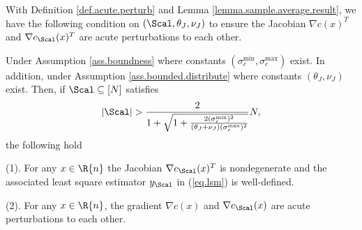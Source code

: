 
With Definition \ref{def.acute.perturb} and Lemma \ref{lemma.sample.average.result}, we have the following condition on $(\Scal,\theta_J,\nu_J)$ to ensure the Jacobian $\nabla c(x)^T$ and $\nabla c_{\Scal}(x)^T$ are acute perturbations to each other.

\begin{lemma}
\label{lemma.acute.perturb}
	Under Assumption \ref{ass.boundness} where constants $(\sigma_c^{\min},\sigma_c^{\max})$ exist. In addition, under Assumption \ref{ass.bounded.distribute} where constants $(\theta_J,\nu_J)$ exist. Then, if $\Scal\subseteq[N]$ satisfies 
	\[
	|\Scal|>\frac{2}{1+\sqrt{1+\frac{2(\sigma_c^{\min})^2}{(\theta_J+\nu_J)(\sigma_c^{\max})^2}}}N ,
	\]
	the following hold 
	\bitemize 
	\item[(1).]For any $x\in\R{n}$ the Jacobian $\nabla c_{\Scal}(x)^T$ is nondegenerate and the associated least square estimator $y_{\Scal}$ in (\ref{eq.lsm}) is well-defined.
	\item[(2).] For any $x\in\R{n}$, the gradient $\nabla c(x)$ and $\nabla c_{\Scal}(x)$ are acute perturbations to each other.	
	\eitemize
\end{lemma}


